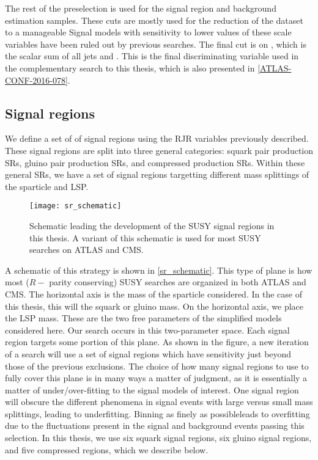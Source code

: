 The rest of the preselection is used for the signal region and background estimation samples.
These cuts are mostly used for the reduction of the dataset to a manageable
Signal models with sensitivity to lower values of these scale variables have been ruled out by previous searches\cite{SUSY-2015-06}.
The final cut is on \meff, which is the scalar sum of all jets and \met.
This is the final discriminating variable used in the complementary search to this thesis, which is also presented in \ref{ATLAS-CONF-2016-078}.



\subsection{Signal regions}
We define a set of of signal regions using the RJR variables previously described.
These signal regions are split into three general categories: squark pair production SRs, gluino pair production SRs, and compressed production SRs.
Within these general SRs, we have a set of signal regions targetting different mass splittings of the sparticle and LSP.
\begin{figure}
\caption{Schematic leading the development of the SUSY signal regions in this thesis.
A variant of this schematic is used for most SUSY searches on ATLAS and CMS.
} \label{fig:sr_schematic}
\texttt{[image: sr\_schematic]}
\end{figure}

A schematic of this strategy is shown in \ref{sr_schematic}.
This type of plane is how most ($R-$ parity conserving) SUSY searches are organized in both ATLAS and CMS.
The horizontal axis is the mass of the sparticle considered.
In the case of this thesis, this will the squark or gluino mass.
On the horizontal axis, we place the LSP mass.
These are the two free parameters of the simplified models considered here.
Our search occurs in this two-parameter space.
Each signal region targets some portion of this plane.
As shown in the figure, a new iteration of a search will use a set of signal regions which have sensitivity just beyond those of the previous exclusions.
The choice of how many signal regions to use to fully cover this plane is in many ways a matter of judgment, as it is essentially a matter of under/over-fitting to the signal models of interest.
One signal region will obscure the different phenomena in signal events with large versus small mass splittings, leading to underfitting.
Binning as finely as possible\footnotemark leads to overfitting due to the fluctuations present in the signal and background events passing this selection.
In this thesis, we use six squark signal regions, six gluino signal regions, and five compressed regions, which we describe below.

